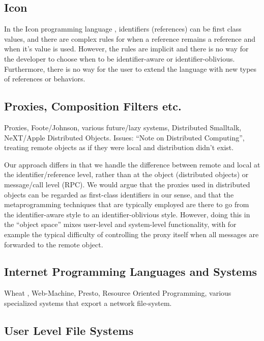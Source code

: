 \documentclass[preprint,authoryear]{acm_proc_article-sp}
\begin{document}
\subsection{Icon}

In the Icon programming language \cite{IconRef} , identifiers (references) can be first class values,
and there are complex rules for when a reference remains a reference and when
it's value is used.  However, the rules are implicit and there is no way for the 
developer to choose when to be identifier-aware or identifier-oblivious.  Furthermore,
there is no way for the user to extend the language with new types of references 
or behaviors.



\subsection{Proxies, Composition Filters etc.}

Proxies\cite{VanCutsemMiller}, Foote/Johnson, various future/lazy systems, Distributed Smalltalk,
NeXT/Apple Distributed Objects.  Issues:  ``Note on Distributed Computing'', treating
remote objects as if they were local and distribution didn't exist.  

Our approach differs in that we handle the difference between remote and local at
the identifier/reference level, rather than at the object (distributed objects) or 
message/call level (RPC).  We would argue that the proxies used in distributed
objects can be regarded as first-class identifiers in our sense, and that the 
metaprogramming techniques that are typically employed are there to go from
the identifier-aware style to an identifier-oblivious style.  However, doing this
in the ``object space'' mixes user-level and system-level functionality, with
for example the typical difficulty of controlling the proxy itself when all messages
are forwarded to the remote object.

\subsection{Internet Programming Languages and Systems}

Wheat \cite{wheat}, Web-Machine, Presto, Resource Oriented Programming,
various specialized systems that export a network file-system.

\subsection{User Level File Systems}
\end{document}
